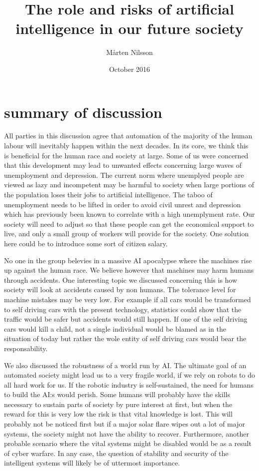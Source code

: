 \documentclass{article}
\title{ The role and risks of artificial intelligence in our future society }
\author{ Mårten Nilsson }
\date{October 2016}
\begin{document}
\maketitle

\thispagestyle{empty}

\section{summary of discussion}
All parties in this discussion agree that automation of the majority of the human labour will inevitably happen within the next decades. In its core, we think this is beneficial for the human race and society at large. Some of us were concerned that this development may lead to unwanted effects concerning large waves of unemployment and depression. The current norm where unemplyed people are viewed as lazy and incompetent may be harmful to society when large portions of the population loses their jobs to artificial intelligence. The taboo of unemployment needs to be lifted in order to avoid civil unrest and depression which has previously been known to correlate with a high unemplyment rate. Our society will need to adjust so that these people can get the economical support to live, and only a small group of workers will provide for the society. One solution here could be to introduce some sort of citizen salary. 

No one in the group belevies in a massive AI apocalypse where the machines rise up against the human race. We believe however that machines may harm humans through accidents. One interesting topic we discussed concerning this is how society will look at accidents caused by non humans. The tolerance level for machine mistakes may be very low. For example if all cars would be transformed to self driving cars with the present technology, statistics could show that the traffic would be safer but accidents would still happen. If one of the self driving cars would kill a child, not a single individual would be blamed as in the situation of today but rather the wole entity of self driving cars would bear the responsability. 

We also discussed the robustness of a world run by AI. The ultimate goal of an automated society might lead us to a very fragile world, if we rely on robots to do all hard work for us. If the robotic industry is self-sustained, the need for humans to build the AI:s would perish. Some humans will probably have the skills necessary to sustain parts of society by pure interest at first, but when the reward for this is very low the risk is that vital knowledge is lost. This will probably not be noticed first but if a major solar flare wipes out a lot of major systems, the society might not have the ability to recover. Furthermore, another probable scenario where the vital systems might be disabled would be as a result of cyber warfare. In any case, the question of stability and security of the intelligent systems will likely be of uttermost importance.
\end{document}
